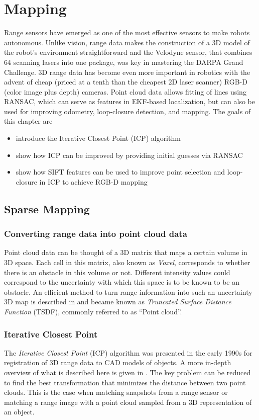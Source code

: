 \chapter{Mapping}
 Range sensors have emerged as one of the most effective sensors to make robots autonomous. Unlike vision, range data makes the construction of a 3D model of the robot's environment straightforward and the Velodyne sensor, that combines 64 scanning lasers into one package, was key in mastering the DARPA Grand Challenge.  3D range data has become even more important in robotics with the advent of cheap (priced at a tenth than the cheapest 2D laser scanner) RGB-D (color image plus depth) cameras. Point cloud data allows fitting of lines using RANSAC, which can serve as features in EKF-based localization, but can also be used for improving odometry, loop-closure detection, and mapping. The goals of this chapter are
\begin{itemize}
\item introduce the Iterative Closest Point (ICP) algorithm
\item show how ICP can be improved by providing initial guesses via RANSAC
\item show how SIFT features can be used to improve point selection and loop-closure in ICP to achieve RGB-D mapping
\end{itemize}


\section{Sparse Mapping}

\subsection{Converting range data into point cloud data}
Point cloud data can be thought of a 3D matrix that maps a certain volume in 3D space. Each cell in this matrix, also known as \emph{Voxel}, corresponds to whether there is an obstacle in this volume or not. Different intensity values could correspond to the uncertainty with which this space is to be known to be an obstacle. An efficient method to turn range information into such an uncertainty 3D map is described in \cite{curless96} and became known as \emph{Truncated Surface Distance Function} (TSDF), commonly referred to as ``Point cloud''.

\subsection{Iterative Closest Point}
The \emph{Iterative Closest Point} (ICP) algorithm was presented in the early 1990s for registration of 3D range data to CAD models of objects. A more in-depth overview of what is described here is given in \cite{rusinkiewicz01}. The key problem can be reduced to find the best transformation that minimizes the distance between two point clouds. This is the case when matching snapshots from a range sensor or matching a range image with a point cloud sampled from a 3D representation of an object.

